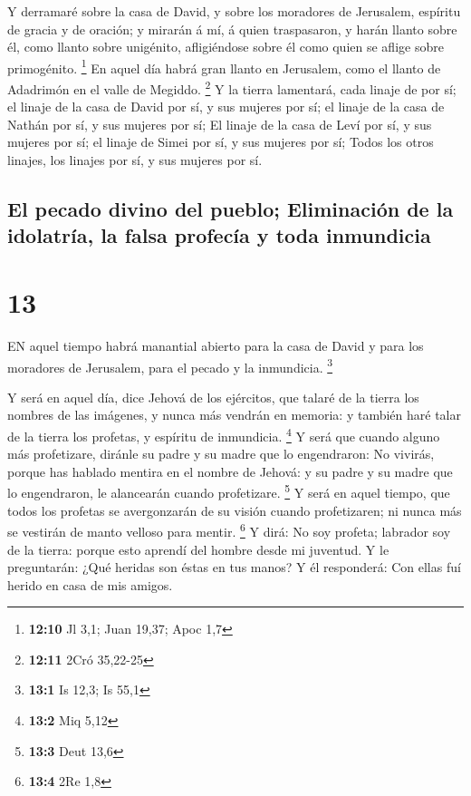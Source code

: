  Y derramaré sobre la casa de David, y sobre los moradores
de Jerusalem, espíritu de gracia y de oración; y mirarán á mí, á quien
traspasaron, y harán llanto sobre él, como llanto sobre unigénito,
afligiéndose sobre él como quien se aflige sobre primogénito.
\footnote{\textbf{12:10} Jl 3,1; Juan 19,37; Apoc 1,7}  En
aquel día habrá gran llanto en Jerusalem, como el llanto de Adadrimón en
el valle de Megiddo. \footnote{\textbf{12:11} 2Cró 35,22-25}
 Y la tierra lamentará, cada linaje de por sí; el linaje de
la casa de David por sí, y sus mujeres por sí; el linaje de la casa de
Nathán por sí, y sus mujeres por sí;  El linaje de la casa
de Leví por sí, y sus mujeres por sí; el linaje de Simei por sí, y sus
mujeres por sí;  Todos los otros linajes, los linajes por
sí, y sus mujeres por sí.

\hypertarget{el-pecado-divino-del-pueblo-eliminaciuxf3n-de-la-idolatruxeda-la-falsa-profecuxeda-y-toda-inmundicia}{%
\subsection{El pecado divino del pueblo; Eliminación de la idolatría, la
falsa profecía y toda
inmundicia}\label{el-pecado-divino-del-pueblo-eliminaciuxf3n-de-la-idolatruxeda-la-falsa-profecuxeda-y-toda-inmundicia}}

\hypertarget{section-12}{%
\section{13}\label{section-12}}

 EN aquel tiempo habrá manantial abierto para la casa de
David y para los moradores de Jerusalem, para el pecado y la inmundicia.
\footnote{\textbf{13:1} Is 12,3; Is 55,1}

 Y será en aquel día, dice Jehová de los ejércitos, que
talaré de la tierra los nombres de las imágenes, y nunca más vendrán en
memoria: y también haré talar de la tierra los profetas, y espíritu de
inmundicia. \footnote{\textbf{13:2} Miq 5,12}  Y será que
cuando alguno más profetizare, diránle su padre y su madre que lo
engendraron: No vivirás, porque has hablado mentira en el nombre de
Jehová: y su padre y su madre que lo engendraron, le alancearán cuando
profetizare. \footnote{\textbf{13:3} Deut 13,6}  Y será en
aquel tiempo, que todos los profetas se avergonzarán de su visión cuando
profetizaren; ni nunca más se vestirán de manto velloso para mentir.
\footnote{\textbf{13:4} 2Re 1,8}  Y dirá: No soy profeta;
labrador soy de la tierra: porque esto aprendí del hombre desde mi
juventud.  Y le preguntarán: ¿Qué heridas son éstas en tus
manos? Y él responderá: Con ellas fuí herido en casa de mis amigos.

